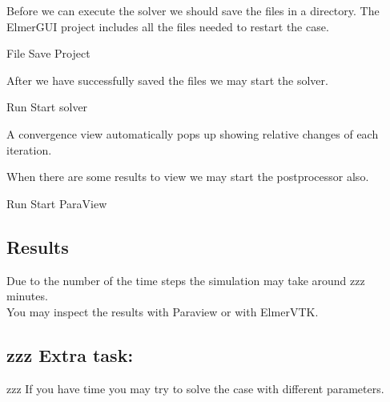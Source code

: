 Before we can execute the solver we should save the files in a directory.  The ElmerGUI project includes all the files needed to restart the case.

\ttbegin
File 
  Save Project
\ttend

After we have successfully saved the files we may start the solver.

\ttbegin
Run
  Start solver
\ttend

A convergence view automatically pops up showing relative changes of each iteration.

When there are some results to view we may start the postprocessor also.

\ttbegin
Run
  Start ParaView
\ttend

\subsection*{Results}

Due to the number of the time steps the simulation may take around zzz minutes.\\

You may inspect the results with Paraview or with ElmerVTK.\\



\subsection*{zzz Extra task:}

zzz If you have time you may try to solve the case with different parameters.

\hfill

